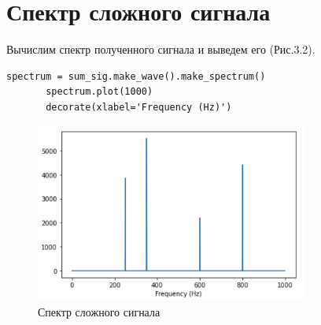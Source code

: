 \documentclass[a4paper,12pt]{report}
\begin{document}
\section{Спектр сложного сигнала}
    Вычислим спектр полученного сигнала и выведем его (Рис.3.2).
\begin{lstlisting}[caption=Вычисление спектра сложного сигнала]
       spectrum = sum_sig.make_wave().make_spectrum()
       spectrum.plot(1000)
       decorate(xlabel='Frequency (Hz)')
\end{lstlisting}
\begin{figure}[H]
        \centering
        \includegraphics[width=0.8\textwidth]{fig3-2.PNG}
        \caption{Спектр сложного сигнала}
        \label{fig:fig3-2}
\end{figure}
\end{document}
